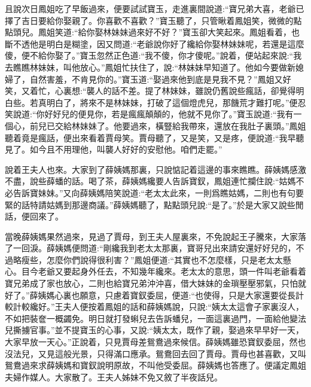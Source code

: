 \begin{parag}
    且說次日鳳姐吃了早飯過來，便要試試寶玉，走進裏間說道:“寶兄弟大喜，老爺已擇了吉日要給你娶親了。你喜歡不喜歡？”寶玉聽了，只管瞅着鳳姐笑，微微的點點頭兒。鳳姐笑道:“給你娶林妹妹過來好不好？”寶玉卻大笑起來。鳳姐看着，也斷不透他是明白是糊塗，因又問道:“老爺說你好了纔給你娶林妹妹呢，若還是這麼傻，便不給你娶了。”寶玉忽然正色道:“我不傻，你才傻呢。”說着，便站起來說:“我去瞧瞧林妹妹，叫他放心。”鳳姐忙扶住了，說:“林妹妹早知道了。他如今要做新媳婦了，自然害羞，不肯見你的。”寶玉道:“娶過來他到底是見我不見？”鳳姐又好笑，又着忙，心裏想:“襲人的話不差。提了林妹妹，雖說仍舊說些瘋話，卻覺得明白些。若真明白了，將來不是林妹妹，打破了這個燈虎兒，那饑荒才難打呢。”便忍笑說道:“你好好兒的便見你，若是瘋瘋顛顛的，他就不見你了。”寶玉說道:“我有一個心，前兒已交給林妹妹了。他要過來，橫豎給我帶來，還放在我肚子裏頭。”鳳姐聽着竟是瘋話，便出來看着賈母笑。賈母聽了，又是笑，又是疼，便說道:“我早聽見了。如今且不用理他，叫襲人好好的安慰他。咱們走罷。”
\end{parag}


\begin{parag}
    說着王夫人也來。大家到了薛姨媽那裏，只說惦記着這邊的事來瞧瞧。薛姨媽感激不盡，說些薛蟠的話。喝了茶，薛姨媽纔要人告訴寶釵，鳳姐連忙攔住說:“姑媽不必告訴寶妹妹。”又向薛姨媽陪笑說道:“老太太此來，一則爲瞧姑媽，二則也有句要緊的話特請姑媽到那邊商議。”薛姨媽聽了，點點頭兒說:“是了。”於是大家又說些閒話，便回來了。
\end{parag}


\begin{parag}
    當晚薛姨媽果然過來，見過了賈母，到王夫人屋裏來，不免說起王子騰來，大家落了一回淚。薛姨媽便問道:“剛纔我到老太太那裏，寶哥兒出來請安還好好兒的，不過略瘦些，怎麼你們說得很利害？”鳳姐便道:“其實也不怎麼樣，只是老太太懸心。目今老爺又要起身外任去，不知幾年纔來。老太太的意思，頭一件叫老爺看着寶兄弟成了家也放心，二則也給寶兄弟沖沖喜，借大妹妹的金瑣壓壓邪氣，只怕就好了。”薛姨媽心裏也願意，只慮着寶釵委屈，便道:“也使得，只是大家還要從長計較計較纔好。”王夫人便按着鳳姐的話和薛姨媽說，只說:“姨太太這會子家裏沒人，不如把裝奩一概蠲免。明日就打發蝌兒去告訴蟠兒，一面這裏過門，一面給他變法兒撕擄官事。”並不提寶玉的心事，又說:“姨太太，既作了親，娶過來早早好一天，大家早放一天心。”正說着，只見賈母差鴛鴦過來候信。薛姨媽雖恐寶釵委屈，然也沒法兒，又見這般光景，只得滿口應承。鴛鴦回去回了賈母。賈母也甚喜歡，又叫鴛鴦過來求薛姨媽和寶釵說明原故，不叫他受委屈。薛姨媽也答應了。便議定鳳姐夫婦作媒人。大家散了。王夫人姊妹不免又敘了半夜話兒。
\end{parag}


